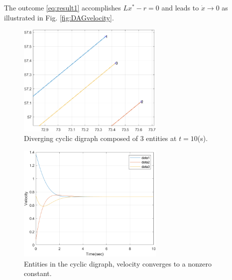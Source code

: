 \documentclass[letterpaper, 10 pt, conference]{ieeeconf}  %
\begin{document}
The outcome \eqref{eq:result1} accomplishes $Lx^* - r = 0$ and leads to $\dot{x} \rightarrow 0$ as illustrated in Fig. \ref{fig:DAGvelocity}. 

\begin{figure}[thb]
\begin{center}
\includegraphics[width=7cm]{IMG/CG_simul3.png}
\caption{Diverging cyclic digraph composed of 3 entities at $t=10$(s).}
\label{fig:DCGstate}
\end{center}
\vspace{-3mm}
\end{figure}

\begin{figure}[thb]
\begin{center}
\includegraphics[width=7cm]{IMG/DCGvelocity.png}
\caption{Entities in the cyclic digraph, velocity converges to a nonzero constant.}
\label{fig:DCGvelocity}
\end{center}
\vspace{-0mm}
\end{figure}

\end{document}
